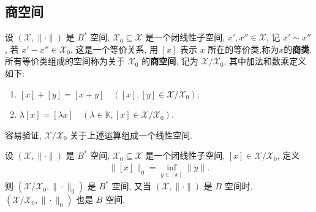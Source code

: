 \documentclass[../../main.tex]{subfiles}%
\begin{document}
\subsection{商空间}

\begin{definition}
设 $(\mathscr{X},\|\cdot\|)$ 是 $B^*$ 空间, $\mathscr{X}_0 \subseteq \mathscr{X}$ 是一个闭线性子空间, $x',x'' \in \mathscr{X}$, 记 $x' \sim x''$, 若 $x'-x'' \in \mathscr{X}_0$. 这是一个等价关系, 用 $[x]$ 表示 $x$ 所在的等价类,称为$x$的\textbf{商类}. 所有等价类组成的空间称为关于 $\mathscr{X}_0$ 的\textbf{商空间}, 记为 $\mathscr{X}/\mathscr{X}_0$, 其中加法和数乘定义如下:
\begin{enumerate}[(1)]
\item $[x] + [y] = [x+y] \quad ([x],[y] \in \mathscr{X}/\mathscr{X}_0)$;
\item $\lambda [x] = [\lambda x] \quad (\lambda \in \mathbb{K}, [x] \in \mathscr{X}/\mathscr{X}_0)$.
\end{enumerate}
容易验证, $\mathscr{X}/\mathscr{X}_0$ 关于上述运算组成一个线性空间.
\end{definition}

\begin{theorem}\label{theorem:闭线性子空间的商空间完备}
设 $(\mathscr{X},\|\cdot\|)$ 是 $B^*$ 空间, $\mathscr{X}_0 \subseteq \mathscr{X}$ 是一个闭线性子空间, $[x] \in \mathscr{X}/\mathscr{X}_0$, 定义
\begin{align*}
\|[x]\|_0 = \inf_{y \in [x]} \|y\|.
\end{align*}
则 $(\mathscr{X}/\mathscr{X}_0,\|\cdot\|_0)$ 是 $B^*$ 空间, 又当 $(\mathscr{X},\|\cdot\|)$ 是 $B$ 空间时, $(\mathscr{X}/\mathscr{X}_0,\|\cdot\|_0)$ 也是 $B$ 空间.
\end{theorem}
\end{document}
